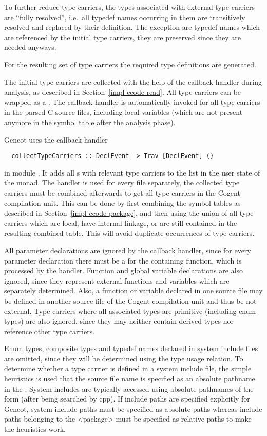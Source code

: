 To further reduce type carriers, the types associated with external type carriers are ``fully resolved'', i.e.~all
typedef names occurring in them are transitively resolved and replaced by their definition. The exception are
typedef names which are referenced by the initial type carriers, they are preserved since they are needed anyways.

For the resulting set of type carriers the required type definitions are generated.

The initial type carriers are collected with the help of the callback handler during analysis, as described in 
Section~\ref{impl-ccode-read}. All type carriers can be wrapped as a . The callback handler 
is automatically invoked for all type carriers in the parsed
C source files, including local variables (which are not present anymore in the symbol table after the analysis phase).

Gencot uses the callback handler
\begin{verbatim}
  collectTypeCarriers :: DeclEvent -> Trav [DeclEvent] ()
\end{verbatim}
in module . It adds all s with relevant type carriers to the list in the 
user state of the  monad. The handler is used for every  file separately, the collected
type carriers must be combined afterwards to get all type carriers in the Cogent compilation unit. This can be
done by first combining the symbol tables as described in Section~\ref{impl-ccode-package}, and then using the union of all 
type carriers which are local, have internal linkage, or are still contained in the resulting combined table. 
This will avoid duplicate occurrences of type carriers.

All parameter declarations are ignored by the callback handler, since for every parameter declaration there must be 
a  for the containing function, which is processed by the handler. Function and global variable declarations 
are also ignored, since they represent external functions and variables which are separately determined. Also,
a function or variable declared in one source file may be defined in another source file of the Cogent compilation unit and thus 
be not external. Type carriers where all associated types are primitive (including enum types) are also ignored, 
since they may neither contain derived types nor reference other type carriers.

Enum types, composite types and typedef names declared in system include files are omitted, since they will be determined 
using the type usage relation. To determine whether
a type carrier is defined in a system include file, the simple heuristics is used that the source file name is specified
as an absolute pathname in the . System includes are typically accessed using absolute pathnames of the 
form  (after being searched by cpp). If include paths are specified explicitly for Gencot, 
system include paths must be 
specified as absolute paths whereas include paths belonging to the <package> must be specified as relative paths
to make the heuristics work.

